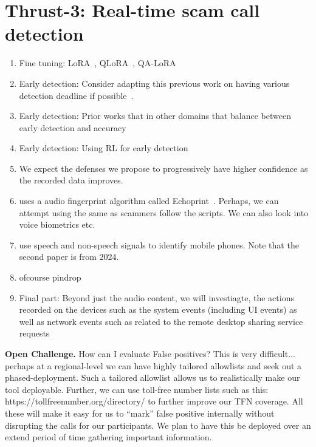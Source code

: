 
\section{Thrust-3: Real-time scam call detection}
\label{sec:thrust_three}


\begin{enumerate}
\item Fine tuning: LoRA~\cite{HuSWALWWC22}, QLoRA~\cite{DettmersPHZ23}, QA-LoRA~\cite{XuXG0CZC0024}
\item Early detection: Consider adapting this previous work on having various detection deadline if possible~\cite{LiuW18}.
\item Early detection: Prior works that in other domains that balance between early detection and accuracy~\cite{GuptaGBD20,BilskiJ23,RingelCFER24}
\item Early detection: Using RL for early detection~\cite{HartvigsenSKR19,abs-2502-06584}
\item We expect the defenses we propose to progressively have higher confidence as the recorded data improves. 
\item \cite{PrasadBMR20} uses a audio fingerprint algorithm called Echoprint~\cite{ellis2011echoprint}. Perhaps, we can attempt using the same as scammers follow the scripts. We can also look into voice biometrics etc.
\item \cite{KotropoulosS14,KritsiolisK24} use speech and non-speech signals to identify mobile phones. Note that the second paper is from 2024.
\item ofcourse pindrop~\cite{BalasubramaniyanPAHT10}
\item Final part: Beyond just the audio content, we will investiagte, the actions recorded on the devices such as the system events (including UI events) as well as network events such as related to the remote desktop sharing service requests 
\end{enumerate}


\textbf{Open Challenge.} How can I evaluate False positives? This is very difficult... perhaps at a regional-level we can have highly tailored allowlists and seek out a phased-deployment. Such a tailored allowlist allows us to realistically make our tool deployable. Further, we can use toll-free number lists such as this: https://tollfreenumber.org/directory/ to further improve our TFN coverage. All these will make it easy for us to ``mark'' false positive internally without disrupting the calls for our participants. We plan to have this be deployed over an extend period of time gathering important information.

